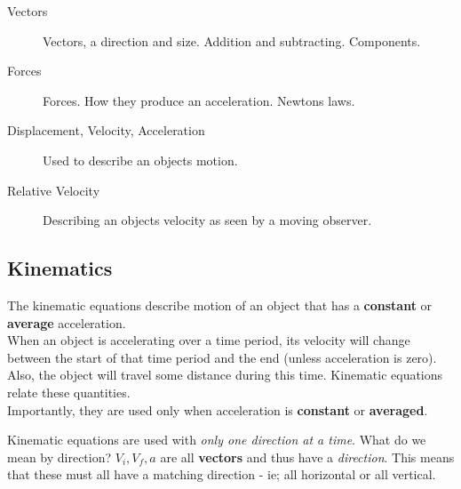 \documentclass[11pt,a4paper]{article}
\begin{document}
\begin{description}
	\item[Vectors] Vectors, a direction and size. Addition and subtracting. Components.
	\item[Forces] Forces. How they produce an acceleration. Newtons laws.
	\item[Displacement, Velocity, Acceleration] Used to describe an objects motion.
	\item[Relative Velocity] Describing an objects velocity as seen by a moving observer. 
\end{description}

\subsection{Kinematics}
The kinematic equations describe motion of an object that has a \textbf{constant} or \textbf{average} acceleration. \\


When an object is accelerating over a time period, its velocity will change between the start of that time period and
the end (unless acceleration is zero). Also, the object will travel some distance during this time. Kinematic
equations relate these quantities. \\

\reversemarginpar 
{}
\normalmarginpar
Importantly, they are used only when acceleration is \textbf{constant} or \textbf{averaged}.

Kinematic equations are used with \emph{only one direction at a time}. What do we mean by direction? $V_i, V_f, a$ are all
\textbf{vectors} and thus have a \emph{direction}. This means that these must all have a matching direction - ie; all horizontal
or all vertical.
\end{document}
